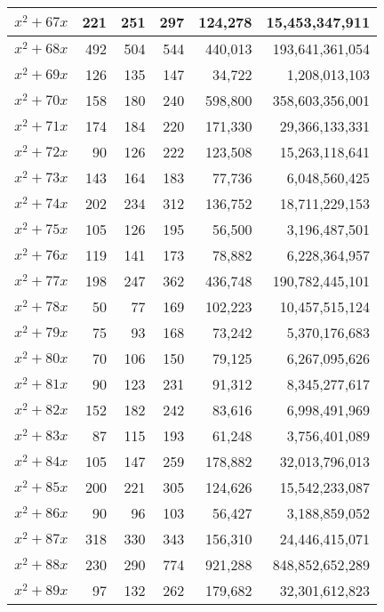 \documentclass[a4paper]{amsproc}
\theoremstyle{plain}
\begin{document}
\begin{longtable}{ | l | r | r | r | r | r | }
$x^2 + 67x$ & 221 & 251 & 297 & 124{,}278 & 15{,}453{,}347{,}911 \\ \hline
$x^2 + 68x$ & 492 & 504 & 544 & 440{,}013 & 193{,}641{,}361{,}054 \\ \hline
$x^2 + 69x$ & 126 & 135 & 147 & 34{,}722 & 1{,}208{,}013{,}103 \\ \hline
$x^2 + 70x$ & 158 & 180 & 240 & 598{,}800 & 358{,}603{,}356{,}001 \\ \hline
$x^2 + 71x$ & 174 & 184 & 220 & 171{,}330 & 29{,}366{,}133{,}331 \\ \hline
$x^2 + 72x$ & 90 & 126 & 222 & 123{,}508 & 15{,}263{,}118{,}641 \\ \hline
$x^2 + 73x$ & 143 & 164 & 183 & 77{,}736 & 6{,}048{,}560{,}425 \\ \hline
$x^2 + 74x$ & 202 & 234 & 312 & 136{,}752 & 18{,}711{,}229{,}153 \\ \hline
$x^2 + 75x$ & 105 & 126 & 195 & 56{,}500 & 3{,}196{,}487{,}501 \\ \hline
$x^2 + 76x$ & 119 & 141 & 173 & 78{,}882 & 6{,}228{,}364{,}957 \\ \hline
$x^2 + 77x$ & 198 & 247 & 362 & 436{,}748 & 190{,}782{,}445{,}101 \\ \hline
$x^2 + 78x$ & 50 & 77 & 169 & 102{,}223 & 10{,}457{,}515{,}124 \\ \hline
$x^2 + 79x$ & 75 & 93 & 168 & 73{,}242 & 5{,}370{,}176{,}683 \\ \hline
$x^2 + 80x$ & 70 & 106 & 150 & 79{,}125 & 6{,}267{,}095{,}626 \\ \hline
$x^2 + 81x$ & 90 & 123 & 231 & 91{,}312 & 8{,}345{,}277{,}617 \\ \hline
$x^2 + 82x$ & 152 & 182 & 242 & 83{,}616 & 6{,}998{,}491{,}969 \\ \hline
$x^2 + 83x$ & 87 & 115 & 193 & 61{,}248 & 3{,}756{,}401{,}089 \\ \hline
$x^2 + 84x$ & 105 & 147 & 259 & 178{,}882 & 32{,}013{,}796{,}013 \\ \hline
$x^2 + 85x$ & 200 & 221 & 305 & 124{,}626 & 15{,}542{,}233{,}087 \\ \hline
$x^2 + 86x$ & 90 & 96 & 103 & 56{,}427 & 3{,}188{,}859{,}052 \\ \hline
$x^2 + 87x$ & 318 & 330 & 343 & 156{,}310 & 24{,}446{,}415{,}071 \\ \hline
$x^2 + 88x$ & 230 & 290 & 774 & 921{,}288 & 848{,}852{,}652{,}289 \\ \hline
$x^2 + 89x$ & 97 & 132 & 262 & 179{,}682 & 32{,}301{,}612{,}823 \\ \hline

\end{longtable}
\end{document}
